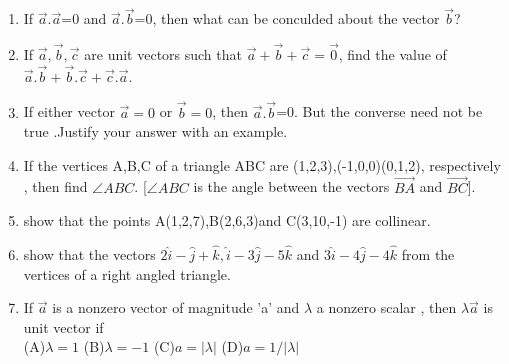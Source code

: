 \documentclass[12pt]{article}
\begin{document}
\begin{enumerate}
\item If $\vec{a}.\vec{a}$=0 and $\vec{a}.\vec{b}$=0, then what can be conculded about the vector $\vec{b}$?
\item If $\vec{a},\vec{b},\vec{c}$ are unit vectors such that $\vec{a}+\vec{b}+\vec{c}=\vec{0}$, find the value of $\vec{a}.\vec{b}+\vec{b}.\vec{c}+\vec{c}.\vec{a}$.
\item If either vector $\vec{a}=0$ or $\vec{b}=0$, then $\vec{a}.\vec{b}$=0. But the converse need not be true .Justify your answer with an example.
\item If the vertices A,B,C of a triangle ABC are (1,2,3),(-1,0,0)(0,1,2), respectively , then find  $\angle{ABC}$. [$\angle{ABC}$ is the angle between the vectors $\overrightarrow{BA}$ and $\overrightarrow{BC}$].
\item show that the points A(1,2,7),B(2,6,3)and C(3,10,-1) are collinear.
\item show that the vectors $2\hat{i}-\hat{j}+\hat{k},\hat{i}-3\hat{j}-5\hat{k}$ and  $3\hat{i}-4\hat{j}-4\hat{k}$ from the vertices of a right angled triangle.
\item If $\vec{a}$ is a nonzero vector of magnitude 'a' and $\lambda$ a nonzero scalar , then $\lambda\vec{a}$ is unit vector if 
\\ (A)$\lambda=1$ (B)$\lambda=-1$  (C)$a=\left|\lambda\right|$  (D)$a=1/\left|\lambda\right|$

\end{enumerate}
\end{document}
